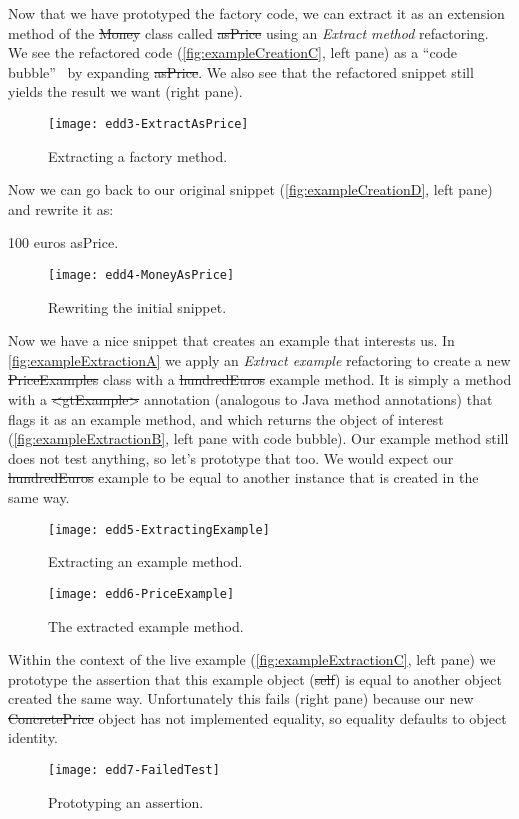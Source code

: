 \documentclass[acmsmall,screen,authorversion,nonacm]{acmart} %
\begin{document}
Now that we have prototyped the factory code, we can extract it as an extension method of the \st{Money} class called \st{asPrice} using an \emph{Extract method} refactoring.
We see the refactored code (\autoref{fig:exampleCreationC}, left pane) as a ``code bubble''~\cite{Brag10a} by expanding \st{asPrice}.
We also see that the refactored snippet still yields the result we want (right pane).

\begin{figure}[h]
  \texttt{[image: edd3-ExtractAsPrice]}
	\caption{Extracting a factory method.}
  \label{fig:exampleCreationC}
\end{figure}

Now we can go back to our original snippet (\autoref{fig:exampleCreationD}, left pane) and rewrite it as:
\begin{code}
100 euros asPrice.
\end{code}

\begin{figure}[h]
  \texttt{[image: edd4-MoneyAsPrice]}
	\caption{Rewriting the initial snippet.}
  \label{fig:exampleCreationD}
\end{figure}

Now we have a nice snippet that creates an example that interests us.
In \autoref{fig:exampleExtractionA} we apply an \emph{Extract example} refactoring to create a new \st{PriceExamples} class with a \st{hundredEuros} example  method.
It is simply a method with a \st{<gtExample>} annotation (analogous to Java method annotations) that flags it as an example method, and which returns the object of interest (\autoref{fig:exampleExtractionB}, left pane with code bubble).
Our example method still does not test anything, so let's prototype that too.
We would expect our \st{hundredEuros} example to be equal to another instance that is created in the same way.

\begin{figure}[h]
  \texttt{[image: edd5-ExtractingExample]}
	\caption{Extracting an example method.}
  \label{fig:exampleExtractionA}
\end{figure}

\begin{figure}[h]
  \texttt{[image: edd6-PriceExample]}
	\caption{The extracted example method.}
  \label{fig:exampleExtractionB}
\end{figure}

Within the context of the live example (\autoref{fig:exampleExtractionC}, left pane) we prototype the assertion that this example object (\ie \st{self}) is equal to another object created the same way.
Unfortunately this fails (right pane) because our new \st{ConcretePrice} object has not implemented equality, so equality defaults to object identity.
\begin{figure}[h]
  \texttt{[image: edd7-FailedTest]}
	\caption{Prototyping an assertion.}
  \label{fig:exampleExtractionC}
\end{figure}
\end{document}
